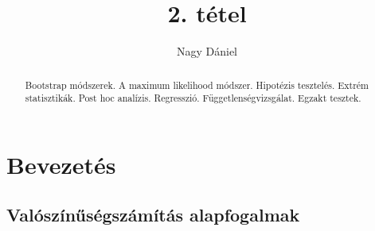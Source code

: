 \documentclass[12pt]{article}
\theoremstyle{plain}
\begin{document}
\title{2. tétel}
\author{Nagy Dániel}
\maketitle


\newpage
\begin{abstract}
    Bootstrap módszerek. A maximum likelihood módszer. Hipotézis tesztelés. Extrém statisztikák.
    Post hoc analízis. Regresszió. Függetlenségvizsgálat. Egzakt tesztek.
\end{abstract}

\section{Bevezetés}
\subsection{Valószínűségszámítás alapfogalmak}
\end{document}
